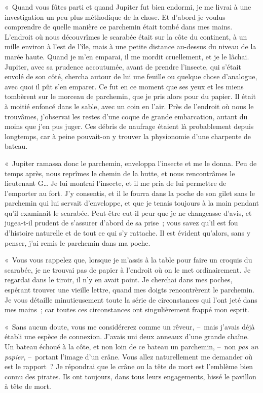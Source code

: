 \documentclass[french,twoside]{book} %
\begin{document}
« Quand vous fûtes parti et quand Jupiter fut bien endormi, je me livrai à une investigation un peu plus méthodique de la chose. Et d’abord je voulus comprendre de quelle manière ce parchemin était tombé dans mes mains. L’endroit où nous découvrîmes le scarabée était sur la côte du continent, à un mille environ à l’est de l’île, mais à une petite distance au-dessus du niveau de la marée haute. Quand je m’en emparai, il me mordit cruellement, et je le lâchai. Jupiter, avec sa prudence accoutumée, avant de prendre l’insecte, qui s’était envolé de son côté, chercha autour de lui une feuille ou quelque chose d’analogue, avec quoi il pût s’en emparer. Ce fut en ce moment que ses yeux et les miens tombèrent sur le morceau de parchemin, que je pris alors pour du papier. Il était à moitié enfoncé dans le sable, avec un coin en l’air. Près de l’endroit où nous le trouvâmes, j’observai les restes d’une coque de grande embarcation, autant du moins que j’en pus juger. Ces débris de naufrage étaient là probablement depuis longtemps, car à peine pouvait-on y trouver la physionomie d’une charpente de bateau.\par
« Jupiter ramassa donc le parchemin, enveloppa l’insecte et me le donna. Peu de temps après, nous reprîmes le chemin de la hutte, et nous rencontrâmes le lieutenant G… Je lui montrai l’insecte, et il me pria de lui permettre de l’emporter au fort. J’y consentis, et il le fourra dans la poche de son gilet sans le parchemin qui lui servait d’enveloppe, et que je tenais toujours à la main pendant qu’il examinait le scarabée. Peut-être eut-il peur que je ne changeasse d’avis, et jugea-t-il prudent de s’assurer d’abord de sa prise ; vous savez qu’il est fou d’histoire naturelle et de tout ce qui s’y rattache. Il est évident qu’alors, sans y penser, j’ai remis le parchemin dans ma poche.\par
« Vous vous rappelez que, lorsque je m’assis à la table pour faire un croquis du scarabée, je ne trouvai pas de papier à l’endroit où on le met ordinairement. Je regardai dans le tiroir, il n’y en avait point. Je cherchai dans mes poches, espérant trouver une vieille lettre, quand mes doigts rencontrèrent le parchemin. Je vous détaille minutieusement toute la série de circonstances qui l’ont jeté dans mes mains ; car toutes ces circonstances ont singulièrement frappé mon esprit.\par
« Sans aucun doute, vous me considérerez comme un rêveur, – mais j’avais déjà établi une espèce de connexion. J’avais uni deux anneaux d’une grande chaîne. Un bateau échoué à la côte, et non loin de ce bateau un parchemin, – non \emph{pas un papier}, – portant l’image d’un crâne. Vous allez naturellement me demander où est le rapport ? Je répondrai que le crâne ou la tête de mort est l’emblème bien connu des pirates. Ils ont toujours, dans tous leurs engagements, hissé le pavillon à tête de mort.\par
\end{document}
